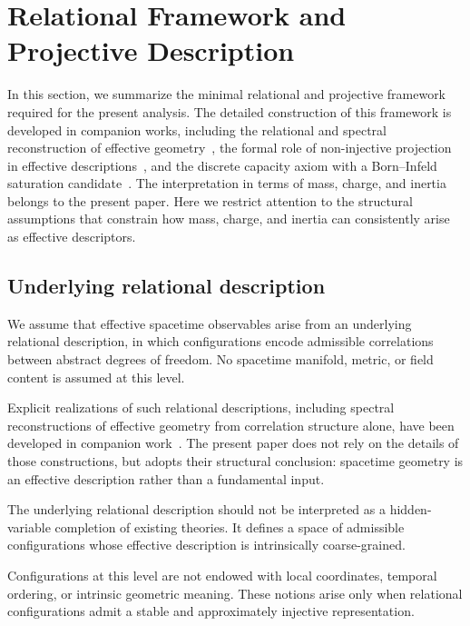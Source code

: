 \documentclass[pdflatex,sn-mathphys-num]{sn-jnl} %
\theoremstyle{remark}
\begin{document}
  \section{Relational Framework and Projective Description}
    \label{sec:framework}

    In this section, we summarize the minimal relational and projective framework
    required for the present analysis.
    The detailed construction of this framework is developed in companion works,
    including the relational and spectral reconstruction of effective
    geometry~\cite{Beau2026a}, the formal role of non-injective projection in
    effective descriptions~\cite{Beau2026b}, and the discrete capacity axiom with a
    Born--Infeld saturation candidate~\cite{Beau2026c}.
    The interpretation in terms of mass, charge, and inertia belongs to the present paper.
    Here we restrict attention to the structural assumptions that constrain how
    mass, charge, and inertia can consistently arise as effective descriptors.

    \subsection{Underlying relational description}
      \label{subsec:relational-description}

      We assume that effective spacetime observables arise from an underlying
      relational description, in which configurations encode admissible correlations
      between abstract degrees of freedom.
      No spacetime manifold, metric, or field content is assumed at this level.

      Explicit realizations of such relational descriptions, including spectral
      reconstructions of effective geometry from correlation structure alone, have
      been developed in companion work~\cite{Beau2026a}.
      The present paper does not rely on the details of those constructions, but
      adopts their structural conclusion: spacetime geometry is an effective
      description rather than a fundamental input.

      The underlying relational description should not be interpreted as a
      hidden-variable completion of existing theories.
      It defines a space of admissible configurations whose effective description is
      intrinsically coarse-grained.

      Configurations at this level are not endowed with local coordinates, temporal
      ordering, or intrinsic geometric meaning.
      These notions arise only when relational configurations admit a stable and
      approximately injective representation.
\end{document}
